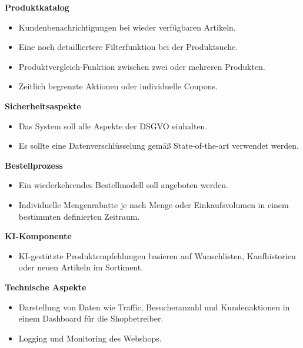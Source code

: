 \documentclass[%
	12pt,
	a4paper,
	oneside,
	parskip=full
]{scrbook}
\begin{document}
	\vspace{0.5cm}
	\textbf{Produktkatalog}
	\begin{itemize}
		\item Kundenbenachrichtigungen bei wieder verfügbaren Artikeln.
		\item Eine noch detailliertere Filterfunktion bei der Produktsuche.
		\item Produktvergleich-Funktion zwischen zwei oder mehreren Produkten.
		\item Zeitlich begrenzte Aktionen oder individuelle Coupons.
	\end{itemize}

	\vspace{0.5cm}
	\textbf{Sicherheitsaspekte}
	\begin{itemize}
		\item Das System soll alle Aspekte der DSGVO einhalten.
		\item Es sollte eine Datenverschlüsselung gemäß State-of-the-art verwendet werden.
	\end{itemize}

	\vspace{0.5cm}
	\textbf{Bestellprozess}
	\begin{itemize}
		\item Ein wiederkehrendes Bestellmodell soll angeboten werden.
		\item Individuelle Mengenrabatte je nach Menge oder Einkaufsvolumen in einem bestimmten definierten Zeitraum.
	\end{itemize}

	\vspace{0.5cm}
	\textbf{KI-Komponente}
	\begin{itemize}
		\item KI-gestützte Produktempfehlungen basieren auf Wunschlisten, Kaufhistorien oder neuen Artikeln im Sortiment.
	\end{itemize}

	\vspace{0.5cm}
	\textbf{Technische Aspekte}
	\begin{itemize}
		\item Darstellung von Daten wie Traffic, Besucheranzahl und Kundenaktionen in einem Dashboard für die Shopbetreiber.
		\item Logging und Monitoring des Webshops.
	\end{itemize}
\end{document}
